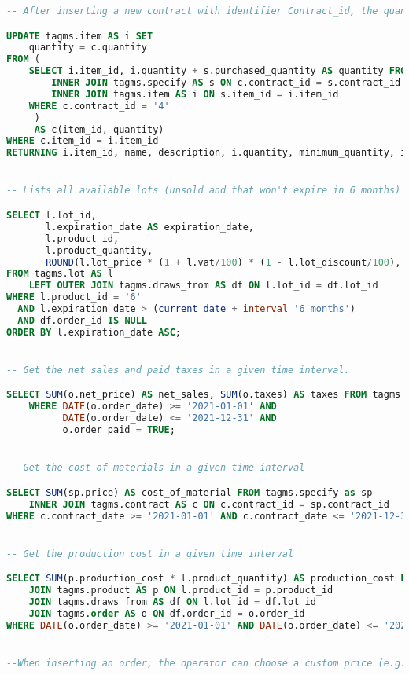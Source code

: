 \begin{lstlisting}[language=SQL,
keywordstyle=\color{blue},
stringstyle=\color{mauve},
showstringspaces=false,
breaklines=true,
basicstyle=\ttfamily\footnotesize]
-- After inserting a new contract with identifier Contract_id, the quantities of items in stock must be incremented in the delivery date.

UPDATE tagms.item AS i SET
    quantity = c.quantity
FROM (
    SELECT i.item_id, i.quantity + s.purchased_quantity AS quantity FROM tagms.contract AS c
        INNER JOIN tagms.specify AS s ON c.contract_id = s.contract_id
        INNER JOIN tagms.item AS i ON s.item_id = i.item_id
    WHERE c.contract_id = '4'
     )
     AS c(item_id, quantity)
WHERE c.item_id = i.item_id
RETURNING i.item_id, name, description, i.quantity, minimum_quantity, item_category_id;


-- Lists all available lots (unsold and that won't expire in 6 months) containing a particular product having a given Product\_id as identifier, sorted by expiration date (oldest lots must be sold first).

SELECT l.lot_id,
       l.expiration_date AS expiration_date,
       l.product_id,
       l.product_quantity,
       ROUND(l.lot_price * (1 + l.vat/100) * (1 - l.lot_discount/100), 2) AS gross_price
FROM tagms.lot AS l
    LEFT OUTER JOIN tagms.draws_from AS df ON l.lot_id = df.lot_id
WHERE l.product_id = '6'
  AND l.expiration_date > (current_date + interval '6 months')
  AND df.order_id IS NULL
ORDER BY l.expiration_date ASC;


-- Get the net sales and paid taxes in a given time interval.

SELECT SUM(o.net_price) AS net_sales, SUM(o.taxes) AS taxes FROM tagms.order AS o
    WHERE DATE(o.order_date) >= '2021-01-01' AND
          DATE(o.order_date) <= '2021-12-31' AND
          o.order_paid = TRUE;


-- Get the cost of materials in a given time interval

SELECT SUM(sp.price) AS cost_of_material FROM tagms.specify as sp
    INNER JOIN tagms.contract AS c ON c.contract_id = sp.contract_id
WHERE c.contract_date >= '2021-01-01' AND c.contract_date <= '2021-12-31';


-- Get the production cost in a given time interval

SELECT SUM(p.production_cost * l.product_quantity) AS production_cost FROM tagms.lot AS l
    JOIN tagms.product AS p ON l.product_id = p.product_id
    JOIN tagms.draws_from AS df ON l.lot_id = df.lot_id
    JOIN tagms.order AS o ON df.order_id = o.order_id
WHERE DATE(o.order_date) >= '2021-01-01' AND DATE(o.order_date) <= '2021-12-31';


--When inserting an order, the operator can choose a custom price (e.g., decided with the customer) or use the following query. Given an order with Order_id, compute the order's net_price and total taxes. Note: the given Order_id must be written twice in the query


\end{lstlisting}
